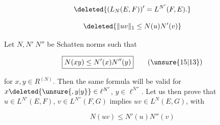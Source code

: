 \[
\deleted{(L_N(E,F))'=L^{N'}(F,E).}
\]


\[
\deleted{\lVert uv\rVert_1\leq N(u)N'(v)}
\]

 Let $N,N'\ N''$ be Schatten norms such that

\[
\boxed{N(xy)\leq N'(x)N''(y)}\tag*{(\unsure{15|13})}
\]

for  $x,y\in R^{(N)}$. Then the same formula will be valid for $x\deleted{\unsure{,y|y}}\in\ell^{N'}$, $y\in\ell^{N''}$. Let us then prove that $u\in L^{N'}(E,F)$, $v\in L^{N''}(F,G)$ implies $uv\in L^N(E,G)$, with

\[
\boxed{N(uv)\leq N'(u)N''(v)}\tag*{(16)}
\]

